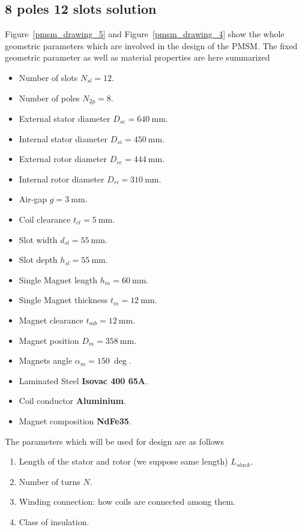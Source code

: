 \documentclass[12pt,a4paper,oneside]{book}
\begin{document}
\begin{onehalfspace}
\section{8 poles 12 slots solution}
Figure~\ref{pmsm_drawing_5} and Figure~\ref{pmsm_drawing_4} show the whole geometric parameters which are involved in the design of the PMSM. The fixed geometric parameter as well as material properties are here summarized
\begin{itemize}
	\item Number of slots $N_{sl}=12$.	
	\item Number of poles $N_{2p}=8$.
	\item External stator diameter $D_{se}=\SI{640}{\milli\meter}$.
	\item Internal stator diameter $D_{si}=\SI{450}{\milli\meter}$.
	\item External rotor diameter $D_{re}=\SI{444}{\milli\meter}$.
	\item Internal rotor diameter $D_{ri}=\SI{310}{\milli\meter}$.
	\item Air-gap $g=\SI{3}{\milli\meter}$.
	\item Coil clearance $t_{cl}=\SI{5}{\milli\meter}$.
	\item Slot width $d_{sl}=\SI{55}{\milli\meter}$.
	\item Slot depth $h_{sl}=\SI{55}{\milli\meter}$.
	\item Single Magnet length $h_{m}=\SI{60}{\milli\meter}$.
	\item Single Magnet thickness $t_{m}=\SI{12}{\milli\meter}$.
	\item Magnet clearance $t_{mb}=\SI{12}{\milli\meter}$.
	\item Magnet position $D_{m}=\SI{358}{\milli\meter}$.
	\item Magnets angle $\alpha_{m}=\SI{150}{\deg}$.
	\item Laminated Steel \textbf{Isovac 400 65A}.
	\item Coil conductor \textbf{Aluminium}.
	\item Magnet composition \textbf{NdFe35}.
\end{itemize}
The parameters which will be used for design are as follows
\begin{enumerate}
	\item Length of the stator and rotor (we suppose same length) $L_{stack}$.
	\item Number of turns $N$.
	\item Winding connection: how coils are connected among them.
	\item Class of insulation.

\end{enumerate}
\end{onehalfspace}
\end{document}
